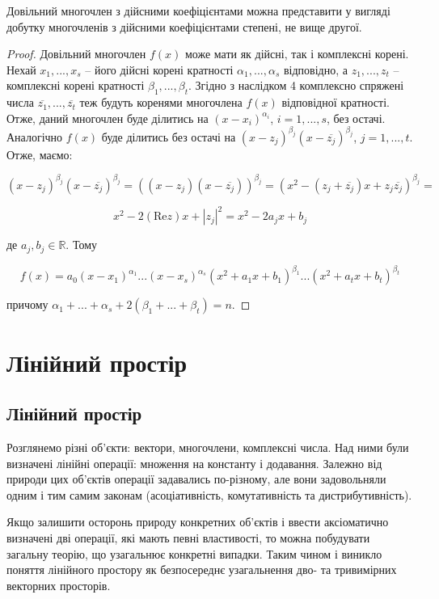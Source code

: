 \begin{corollary}
	Довільний многочлен з дійсними коефіцієнтами можна
	представити у вигляді добутку многочленів з дійсними коефіцієнтами степені, не
	вище другої.
\end{corollary}
\begin{proof}
	Довільний многочлен $f(x)$ може мати як дійсні, так і комплексні
	корені. Нехай $x_1, ..., x_s$ -- його дійсні корені кратності $\alpha_1, ..., \alpha_s$ відповідно,
	а $z_1, ..., z_t$ -- комплексні корені кратності $\beta_1, ..., \beta_t$. Згідно з наслідком 4 комплексно спряжені
	числа $\overline{z_1}, ..., \overline{z_t}$ теж будуть коренями многочлена $f(x)$ відповідної кратності. Отже,
	даний многочлен буде ділитись на $(x - x_i)^{\alpha_i}$, $i = 1, ..., s$, без остачі. Аналогічно
	$f(x)$ буде ділитись без остачі на $(x - z_j)^{\beta_j} (x - \overline{z_j})^{\beta_j}$, 
	$j = 1, ..., t$. Отже, маємо:
	
	$$(x - z_j)^{\beta_j} (x - \overline{z_j})^{\beta_j} = ((x - z_j)(x - \overline{z_j}))^{\beta_j} = (x^2 - (z_j + \overline{z_j})x + z_j\overline{z_j})^{\beta_j} =$$
	
	$$x^2 - 2(\text{Re}z)x + |z_j|^2 = x^2 - 2a_jx + b_j$$	
		
	де $a_j, b_j \in \mathbb{R}$. Тому
	
	$$f(x) = a_0(x-x_1)^{\alpha_1} ... (x-x_s)^{\alpha_s} (x^2 + a_1x + b_1)^{\beta_1} ... (x^2 + a_tx + b_t)^{\beta_t}$$	

	причому $\alpha_1 + ... + \alpha_s + 2(\beta_1 + ... + \beta_t) = n$. 
\end{proof}

\section{Лінійний простір}  %


\subsection{Лінійний простір}

Розглянемо різні об’єкти: вектори, многочлени, комплексні числа. Над ними
були визначені лінійні операції: множення на константу і додавання. Залежно від 
природи цих об’єктів операції задавались по-різному, але вони задовольняли одним
і тим самим законам (асоціативність, комутативність та дистрибутивність).

Якщо залишити осторонь природу конкретних об’єктів і ввести аксіоматично
визначені дві операції, які мають певні властивості, то можна побудувати загальну
теорію, що узагальнює конкретні випадки. Таким чином і виникло поняття
лінійного простору як безпосереднє узагальнення дво- та тривимірних векторних
просторів.

